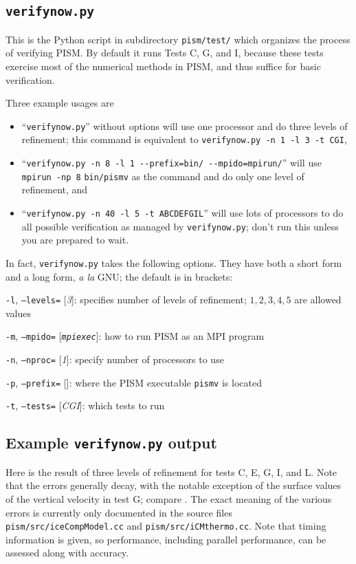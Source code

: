 \documentclass[11pt,final]{amsart}
\newcommand{\optoptdef}[3]{\vspace{1mm}\noindent \large\texttt{-#1},\,\,\texttt{--#2=}\normalsize\,\,[\textsl{#3}]:\quad}
\begin{document}
\subsection{\texttt{verifynow.py}}  This is the Python script in subdirectory \verb|pism/test/| which organizes the process of verifying PISM.  By default it runs Tests C, G, and I, because these tests exercise most of the numerical methods in PISM, and thus suffice for basic verification.

Three example usages are \begin{itemize}
\item ``\verb|verifynow.py|'' without options will use one processor and do three levels of refinement; this command is equivalent to \verb|verifynow.py -n 1 -l 3 -t CGI|,
\item ``\verb|verifynow.py -n 8 -l 1 --prefix=bin/ --mpido=mpirun/|'' will use \verb|mpirun -np 8| \verb|bin/pismv| as the command and do only one level of refinement, and
\item ``\verb|verifynow.py -n 40 -l 5 -t ABCDEFGIL|'' will use lots of processors to do all possible verification as managed by \verb|verifynow.py|; don't run this unless you are prepared to wait.
\end{itemize}

\noindent In fact, \verb|verifynow.py| takes the following options.  They have both a short form and a long form, \emph{a la} GNU; the default is in brackets:

\optoptdef{l}{levels}{3} specifies number of levels of refinement; $1,2,3,4,5$ are allowed values

\optoptdef{m}{mpido}{\texttt{mpiexec}} how to run PISM as an MPI program

\optoptdef{n}{nproc}{1} specify number of processors to use

\optoptdef{p}{prefix}{} where the PISM executable \verb|pismv| is located

\optoptdef{t}{tests}{CGI} which tests to run

\medskip

\subsection{Example \texttt{verifynow.py} output}  Here is the result of three levels of refinement for tests C, E, G, I, and L.  Note that the errors generally decay, with the notable exception of the surface values of the vertical velocity in test G; compare \cite{SaitoMargin}.  The exact meaning of the various errors is currently only documented in the source files \verb|pism/src/iceCompModel.cc| and \verb|pism/src/iCMthermo.cc|.  Note that timing information is given, so performance, including parallel performance, can be assessed along with accuracy.
\end{document}
